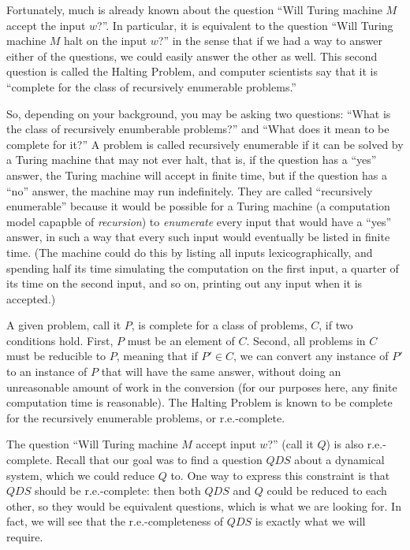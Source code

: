 \documentclass{fkpset}
\begin{document}
Fortunately, much is already known about the question ``Will Turing machine $M$ accept the input $w$?''. In particular, it is equivalent to the question ``Will Turing machine $M$ halt on the input $w$?'' in the sense that if we had a way to answer either of the questions, we could easily answer the other as well. This second question is called the Halting Problem, and computer scientists say that it is ``complete for the class of recursively enumerable problems.''

So, depending on your background, you may be asking two questions: ``What is the class of recursively enumberable problems?'' and ``What does it mean to be complete for it?'' A problem is called recursively enumerable if it can be solved by a Turing machine that may not ever halt, that is, if the question has a ``yes'' answer, the Turing machine will accept in finite time, but if the question has a ``no'' answer, the machine may run indefinitely. They are called ``recursively enumerable'' because it would be possible for a Turing machine (a computation model capapble of {\it recursion}) to {\it enumerate} every input that would have a ``yes'' answer, in such a way that every such input would eventually be listed in finite time. (The machine could do this by listing all inputs lexicographically, and spending half its time simulating the computation on the first input, a quarter of its time on the second input, and so on, printing out any input when it is accepted.)

A given problem, call it $P$, is complete for a class of problems, $C$, if two conditions hold. First, $P$ must be an element of $C$. Second, all problems in $C$ must be reducible to $P$, meaning that if $P' \in C$, we can convert any instance of $P'$ to an instance of $P$ that will have the same answer, without doing an unreasonable amount of work in the conversion (for our purposes here, any finite computation time is reasonable). The Halting Problem is known to be complete for the recursively enumerable problems, or r.e.-complete.

The question ``Will Turing machine $M$ accept input $w$?'' (call it $Q$) is also r.e.-complete. Recall that our goal was to find a question $QDS$ about a dynamical system, which we could reduce $Q$ to. One way to express this constraint is that $QDS$ should be r.e.-complete: then both $QDS$ and $Q$ could be reduced to each other, so they would be equivalent questions, which is what we are looking for. In fact, we will see that the r.e.-completeness of $QDS$ is exactly what we will require.
\end{document}
